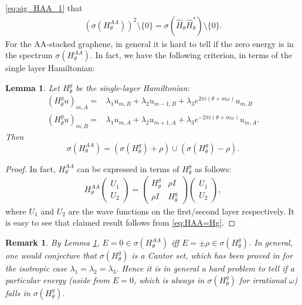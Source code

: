 \documentclass[11pt]{amsart}
\newtheorem{lemma}[theorem]{Lemma}
\newtheorem{remark}[theorem]{Remark}
\begin{document}
\eqref{eq:sig_HAA_1} that
\begin{align}\label{eq:sig_AA_2}
    (\sigma(H_{\theta}^{AA}))^2\setminus \{0\}=\sigma(\widehat{H}_{\theta}\widehat{H}_{\theta}^*)\setminus \{0\}.
\end{align}
For the AA-stacked graphene, in general it is hard to tell if the zero energy is in the spectrum $\sigma(H_{\theta}^{AA})$. In fact, we have the following criterion, in terms of the single layer Hamiltonian:
\begin{lemma}\label{lem:0_AA}
    Let $H_{\theta}^{g}$ be the single-layer Hamiltonian: 
    \begin{align}
    (H_{\theta}^{g}u)_{m,A}=&\lambda_1 u_{m,B}+\lambda_2 u_{m-1,B}+\lambda_3 e^{2\pi i(\theta+m\omega)}u_{m,B}\\
    (H_{\theta}^{g}u)_{m,B}=&\lambda_1 u_{m,A}+\lambda_2 u_{m+1,A}+\lambda_3 e^{-2\pi i(\theta+m\omega)}u_{m,A}.
\end{align}
Then 
\[\sigma(H_{\theta}^{AA})=(\sigma(H_{\theta}^g)+\rho)\cup (\sigma(H_{\theta}^g)-\rho).\] 
\end{lemma}
\begin{proof}
In fact, $H_{\theta}^{AA}$ can be expressed in terms of $H_{\theta}^g$ as follows:
\begin{align}\label{eq:HAA=Hg}
    H_{\theta}^{AA}\left(\begin{matrix}U_1\\ U_2\end{matrix}\right)=\left(\begin{matrix}
        H_{\theta}^g & \rho I\\
        \rho I &H_{\theta}^g
    \end{matrix}\right)\left(\begin{matrix} U_1\\ U_2\end{matrix}\right),
\end{align}
where $U_1$ and $U_2$ are the wave functions on the first/second layer respectively.
It is easy to see that claimed result follows from \eqref{eq:HAA=Hg}.
\end{proof}
\begin{remark}
    By Lemma \ref{lem:0_AA}, $E=0\in \sigma(H_{\theta}^{AA})$ iff $E=\pm \rho\in \sigma(H_{\theta}^g)$. In general, one would conjecture that $\sigma(H_{\theta}^g)$ is a Cantor set, which has been proved in \cite{BHJ} for the isotropic case $\lambda_1=\lambda_2=\lambda_3$. Hence it is in general a hard problem to tell if a particular energy (aside from $E=0$, which is always in $\sigma(H_{\theta}^g)$ for irrational $\omega$) falls in $\sigma(H_{\theta}^g)$.
\end{remark}
\end{document}
